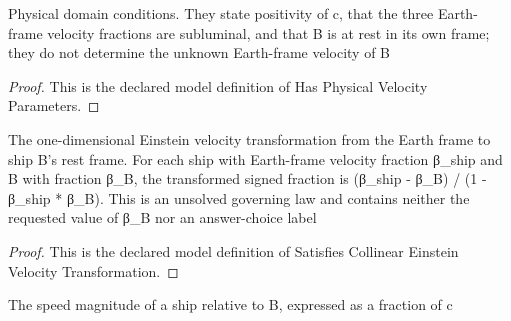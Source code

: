 \begin{definition}
  \label{def:physics:phyx-mini-0590:phyxminiproblems-problemphyxmini0590-hasphysicalvelocityparameters}
  Physical domain conditions. They state positivity of c, that the three Earth-frame velocity fractions are subluminal, and that B is at rest in its own frame; they do not determine the unknown Earth-frame velocity of B
\end{definition}
\begin{proof}
  This is the declared model definition of Has Physical Velocity Parameters.
\end{proof}
\begin{definition}
  \label{def:physics:phyx-mini-0590:phyxminiproblems-problemphyxmini0590-satisfiescollineareinsteinvelocitytransformation}
  The one-dimensional Einstein velocity transformation from the Earth frame to ship B's rest frame. For each ship with Earth-frame velocity fraction β\_ship and B with fraction β\_B, the transformed signed fraction is (β\_ship - β\_B) / (1 - β\_ship * β\_B). This is an unsolved governing law and contains neither the requested value of β\_B nor an answer-choice label
\end{definition}
\begin{proof}
  This is the declared model definition of Satisfies Collinear Einstein Velocity Transformation.
\end{proof}
\begin{definition}
  \label{def:physics:phyx-mini-0590:phyxminiproblems-problemphyxmini0590-speedrelativetoshipbfraction}
  The speed magnitude of a ship relative to B, expressed as a fraction of c
\end{definition}
